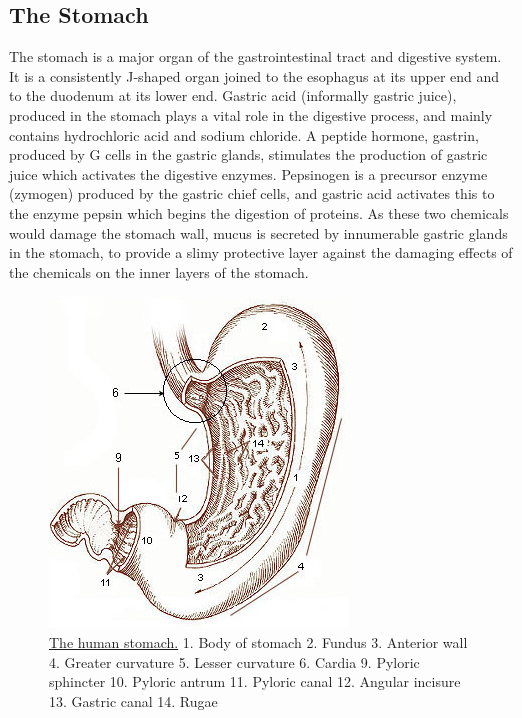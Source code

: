 \hypertarget{the-stomach}{%
\subsection{The Stomach}\label{the-stomach}}

The stomach is a major organ of the gastrointestinal tract and digestive system. It is a consistently J-shaped organ joined to the esophagus at its upper end and to the duodenum at its lower end. Gastric acid (informally gastric juice), produced in the stomach plays a vital role in the digestive process, and mainly contains hydrochloric acid and sodium chloride. A peptide hormone, gastrin, produced by G cells in the gastric glands, stimulates the production of gastric juice which activates the digestive enzymes. Pepsinogen is a precursor enzyme (zymogen) produced by the gastric chief cells, and gastric acid activates this to the enzyme pepsin which begins the digestion of proteins. As these two chemicals would damage the stomach wall, mucus is secreted by innumerable gastric glands in the stomach, to provide a slimy protective layer against the damaging effects of the chemicals on the inner layers of the stomach.



\begin{figure}

{\centering \includegraphics[width=0.7\linewidth]{./figures/digestive/Illu_stomach} 

}

\caption{\href{https://commons.wikimedia.org/wiki/File:Illu_stomach.jpg}{The human stomach.} 1. Body of stomach 2. Fundus 3. Anterior wall 4. Greater curvature 5. Lesser curvature 6. Cardia 9. Pyloric sphincter 10. Pyloric antrum 11. Pyloric canal 12. Angular incisure 13. Gastric canal 14. Rugae}\label{fig:humanstomach}
\end{figure}

